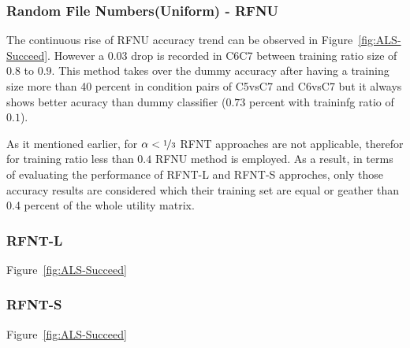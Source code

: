 \documentclass[10pt, conference, compsocconf]{IEEEtran}
\begin{document}
\subsubsection{Random File Numbers(Uniform) - RFNU}
The continuous rise of RFNU accuracy trend can be observed in Figure~\ref{fig:ALS-Succeed}.
However a 0.03 drop is recorded in C6C7 between training ratio size of $0.8$ to $0.9$. 
This method takes over the dummy accuracy after having a training size more than 40 percent 
in condition pairs of C5vsC7 and C6vsC7 but it always shows better acuracy than 
dummy classifier ($0.73$ percent with traininfg ratio of $0.1$).    

As it mentioned earlier, for $\alpha < \nicefrac{1}{3}$ RFNT approaches are not applicable, 
therefor for training ratio less than $0.4$ RFNU method is employed. As a result, in terms of 
evaluating the performance of RFNT-L and RFNT-S approches, only those accuracy results are 
considered which their training set are equal or geather than 0.4 percent of the whole utility matrix. 

\subsubsection{RFNT-L}
Figure~\ref{fig:ALS-Succeed} 

\subsubsection{RFNT-S}
Figure~\ref{fig:ALS-Succeed} 
\end{document}
